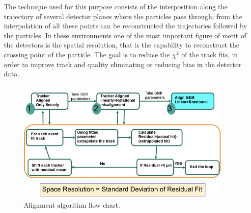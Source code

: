 The technique used for this purpose consists of the interposition along the trajectory of several detector planes where the particles pass through; from the interpolation of all these points can be reconstructed the trajectories followed by the particles.
In these environments one of the most important figure of merit of the detectors is the spatial resolution, that is the capability to reconstruct the crossing point of the particle.
The goal is to reduce the $\chi^{2}$ of the track fits, in order to improve track and quality eliminating or reducing bias in the detector data.

\begin{figure}[htbp]
    \centering
    \includegraphics[width=0.95\textwidth]{figures/GEM/GEM_Alignment_FlowChart.jpeg}
    \caption{Alignment algorithm flow chart.}
    \label{fig:alignment}
\end{figure}

